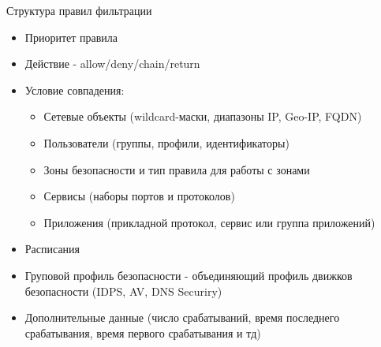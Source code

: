\documentclass[10pt]{beamer}
\begin{document}
\begin{frame}{Структура правил фильтрации}
    \begin{itemize}
        \item Приоритет правила
        \item Действие - allow/deny/chain/return
        \item Условие совпадения:
        \begin{itemize}
            \item Сетевые объекты (wildcard-маски, диапазоны IP, Geo-IP, FQDN)
            \item Пользователи (группы, профили, идентификаторы)
            \item Зоны безопасности и тип правила для работы с зонами
            \item Сервисы (наборы портов и протоколов)
            \item Приложения (прикладной протокол, сервис или группа приложений)
        \end{itemize}
        \item Расписания
        \item Груповой профиль безопасности - объединяющий профиль движков безопасности (IDPS, AV, DNS Securiry)
        \item Дополнительные данные (число срабатываний, время последнего срабатывания, время первого срабатывания и тд)
    \end{itemize}
\end{frame}
\end{document}
